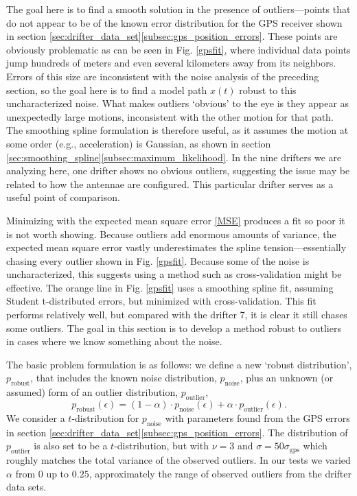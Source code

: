 \documentclass{ametsoc}
\begin{document}
The goal here is to find a smooth solution in the presence of outliers---points that do not appear to be of the known error distribution for the GPS receiver shown in section \ref{sec:drifter_data_set}\ref{subsec:gps_position_errors}. These points are obviously problematic as can be seen in Fig. \ref{gpsfit}, where individual data points jump hundreds of meters and even several kilometers away from its neighbors. Errors of this size are inconsistent with the noise analysis of the preceding section, so the goal here is to find a model path $x(t)$ robust to this uncharacterized noise. What makes outliers `obvious' to the eye is they appear as unexpectedly large motions, inconsistent with the other motion for that path. The smoothing spline formulation is therefore useful, as it assumes the motion at some order (e.g., acceleration) is Gaussian, as shown in section \ref{sec:smoothing_spline}\ref{subsec:maximum_likelihood}. In the nine drifters we are analyzing here, one drifter shows no obvious outliers, suggesting the issue may be related to how the antennae are configured. This particular drifter serves as a useful point of comparison.

Minimizing with the expected mean square error \eqref{MSE} produces a fit so poor it is not worth showing. Because outliers add enormous amounts of variance, the expected mean square error vastly underestimates the spline tension---essentially chasing every outlier shown in Fig. \ref{gpsfit}. Because some of the noise is uncharacterized, this suggests using a method such as cross-validation might be effective. The orange line in Fig. \ref{gpsfit} uses a smoothing spline fit, assuming Student t-distributed errors, but minimized with cross-validation. This fit performs relatively well, but compared with the drifter 7, it is clear it still chases some outliers. The goal in this section is to develop a method robust to outliers in cases where we know something about the noise.

The basic problem formulation is as follows: we define a new `robust distribution', $p_{\textrm{robust}}$, that includes the known noise distribution, $p_{\textrm{noise}}$, plus an unknown (or assumed) form of an outlier distribution, $p_{\textrm{outlier}}$,
\begin{equation}
\label{robust_pdf}
    p_{\textrm{robust}}(\epsilon) = (1-\alpha) \cdot p_{\textrm{noise}}(\epsilon) + \alpha \cdot  p_{\textrm{outlier}}(\epsilon).
\end{equation}
We consider
a $t$-distribution for $p_{\textrm{noise}}$ with parameters found from the GPS errors in section \ref{sec:drifter_data_set}\ref{subsec:gps_position_errors}. The distribution of $ p_{\textrm{outlier}}$ is also set to be a $t$-distribution, but with $\nu=3$ and $\sigma=50\sigma_\textrm{gps}$ which roughly matches the total variance of the observed outliers. In our tests we varied $\alpha$ from 0 up to $0.25$, approximately the range of observed outliers from the drifter data sets.
\end{document}
